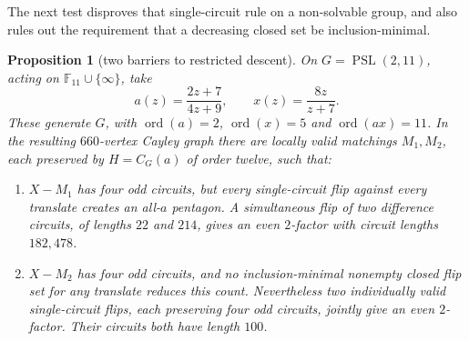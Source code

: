 \documentclass[11pt,a4paper]{article}
\newtheorem{proposition}[theorem]{Proposition}
\theoremstyle{definition}
\theoremstyle{remark}
\newcommand{\ord}{\operatorname{ord}}
\newcommand{\PSL}{\operatorname{PSL}}
\begin{document}
The next test disproves that single-circuit rule on a non-solvable group, and also rules out the requirement that a decreasing closed set be inclusion-minimal.
\begin{proposition}[two barriers to restricted descent]\label{prop:block-barriers}
On $G=\PSL(2,11)$, acting on $\mathbb F_{11}\cup\{\infty\}$, take
\[
 a(z)=\frac{2z+7}{4z+9},\qquad x(z)=\frac{8z}{z+7}.
\]
These generate $G$, with $\ord(a)=2$, $\ord(x)=5$ and $\ord(ax)=11$.  In the resulting $660$-vertex Cayley graph there are locally valid matchings $M_1,M_2$, each preserved by $H=C_G(a)$ of order twelve, such that:
\begin{enumerate}[label=\textup{(\roman*)}]
\item $X-M_1$ has four odd circuits, but every single-circuit flip against \emph{every} translate creates an all-$a$ pentagon.  A simultaneous flip of two difference circuits, of lengths $22$ and $214$, gives an even $2$-factor with circuit lengths $182,478$.
\item $X-M_2$ has four odd circuits, and no inclusion-minimal nonempty closed flip set for \emph{any} translate reduces this count.  Nevertheless two individually valid single-circuit flips, each preserving four odd circuits, jointly give an even $2$-factor.  Their circuits both have length $100$.
\end{enumerate}
\end{proposition}
\end{document}
